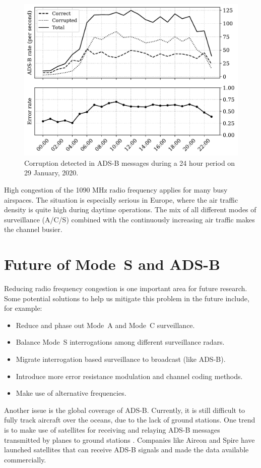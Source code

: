 \begin{figure}[ht]
    \centering
    \includegraphics[width=0.7\columnwidth]{figures/conclusion/adsb_corruption.pdf}
    \caption{Corruption detected in ADS-B messages during a 24 hour period on 29
    January, 2020.}
    \label{fig:adsb_corruption}
\end{figure}

High congestion of the 1090 MHz radio frequency applies for many busy airspaces. The situation is especially serious in Europe, where the air traffic density is quite high during daytime operations. The mix of all different modes of surveillance (A/C/S) combined with the continuously increasing air traffic makes the channel busier.  

\section{Future of Mode~S and ADS-B}
Reducing radio frequency congestion is one important area for future research. Some potential solutions to help us mitigate this problem in the future include, for example:

\begin{itemize}
    \item Reduce and phase out Mode~A and Mode~C surveillance.
    \item Balance Mode~S interrogations among different surveillance radars.
    \item Migrate interrogation based surveillance to broadcast (like ADS-B).
    \item Introduce more error resistance modulation and channel coding methods.
    \item Make use of alternative frequencies.
\end{itemize}

Another issue is the global coverage of ADS-B. Currently, it is still difficult to fully track aircraft over the oceans, due to the lack of ground stations. One trend is to make use of satellites for receiving and relaying ADS-B messages transmitted by planes to ground stations \cite{noschese2011}. Companies like Aireon and Spire have launched satellites that can receive ADS-B signals and made the data available commercially. 

